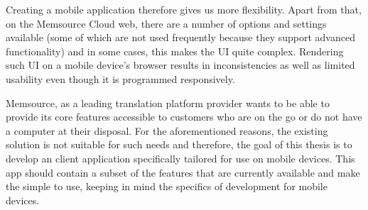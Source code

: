 Creating a mobile application therefore gives us more flexibility. Apart from that, on the Memsource Cloud web, there are a number of options and settings available (some of which are not used frequently because they support advanced functionality) and in some cases, this makes the UI quite complex. Rendering such UI on a mobile device's browser results in inconsistencies as well as limited usability even though it is programmed responsively.

Memsource, as a leading translation platform provider wants to be able to provide its core features accessible to customers who are on the go or do not have a computer at their disposal. For the aforementioned reasons, the existing solution is not suitable for such needs and therefore, the goal of this thesis is to develop an client application specifically tailored for use on mobile devices. This app should contain a subset of the features that are currently available and make the simple to use, keeping in mind the specifics of development for mobile devices.




